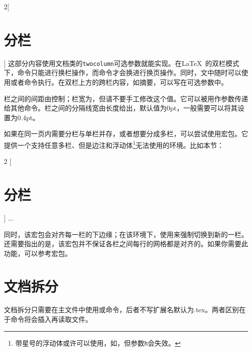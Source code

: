 \begin{multicols}{2}[\section{分栏}]
这部分内容使用文档类的\texttt{two\-column}可选参数就能实现。在\LaTeX\ 的双栏模式下，命令只能进行换栏操作，而命令才会换进行换页操作。同时，文中随时可以使用或者命令执行。在双栏上方的跨栏内容，如摘要，可以写在可选参数中。

栏之间的间距由控制；栏宽为，但请不要手工修改这个值。它可以被用作参数传递给其他命令。栏之间的分隔线宽由长度给出，默认值为0pt，一般需要可以将其设置为0.4pt。 

如果在同一页内需要分栏与单栏并存，或者想要分成多栏，可以尝试使用宏包。它提供一个支持任意多栏、但是边注和浮动体\footnote{带星号的浮动体或许可以使用，如，但参数\texttt{h}会失效。}无法使用的环境。比如本节：
\begin{latex}
\begin{multicols}{2}
  [\section{分栏}]
  ...
\end{multicols}
\end{latex}

同时，该宏包会对齐每一栏的下边缘；在该环境下，使用来强制切换到新的一栏。还需要指出的是，该宏包并不保证各栏之间每行的网格都是对齐的。如果你需要此功能，可以参考宏包。
\end{multicols}

\section{文档拆分}
\label{sec:include}
文档拆分只需要在主文件中使用或命令，后者不写扩展名默认为.tex。两者区别在于命令将会插入再读取文件。


